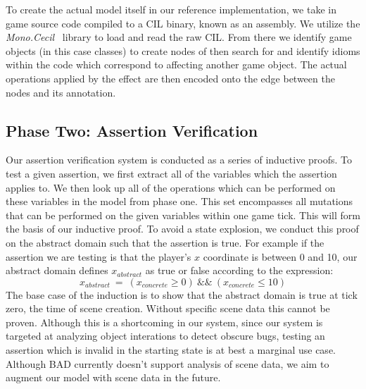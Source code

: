 \documentclass[letterpaper,twocolumn,10pt]{article}
\begin{document}
To create the actual model itself in our reference implementation, we take in game source code compiled to a CIL binary, known as an assembly. We utilize the \textit{Mono.Cecil}~\cite{Mono.Cecil} library to load and read the raw CIL. From there we identify game objects (in this case classes) to create nodes of then search for and identify idioms within the code which correspond to affecting another game object. The actual operations applied by the effect are then encoded onto the edge between the nodes and its annotation. \\

\subsection{Phase Two: Assertion Verification}

Our assertion verification system is conducted as a series of inductive proofs. To test a given assertion, we first extract all of the variables which the assertion applies to. We then look up all of the operations which can be performed on these variables in the model from phase one. This set encompasses all mutations that can be performed on the given variables within one game tick. This will form the basis of our inductive proof. To avoid a state explosion, we conduct this proof on the abstract domain such that the assertion is true. For example if the assertion we are testing is that the player's $x$ coordinate is between 0 and 10, our abstract domain defines $x_{abstract}$ as true or false according to the expression:
\begin{displaymath}x_{abstract}~=~(x_{concrete}\geq0)~\&\&~(x_{concrete}\leq10)
\end{displaymath}
The base case of the induction is to show that the abstract domain is true at tick zero, the time of scene creation. Without specific scene data this cannot be proven. Although this is a shortcoming in our system, since our system is targeted at analyzing object interations to detect obscure bugs, testing an assertion which is invalid in the starting state is at best a marginal use case. Although BAD currently doesn't support analysis of scene data, we aim to augment our model with scene data in the future. \\
\end{document}
